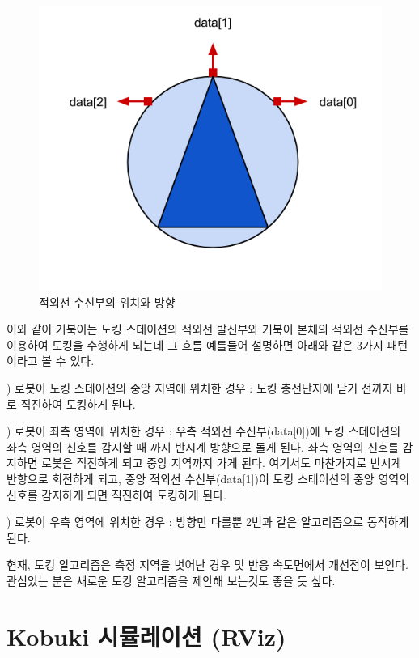 \begin{figure}[h]
\centering\includegraphics[width=0.6\columnwidth]{pictures/chapter10/dock_ir.png}
\caption{적외선 수신부의 위치와 방향}
\end{figure}

이와 같이 거북이는 도킹 스테이션의 적외선 발신부와 거북이 본체의 적외선 수신부를 이용하여 도킹을 수행하게 되는데 그 흐름 예를들어 설명하면 아래와 같은 3가지 패턴이라고 볼 수 있다.


\setcounter{num}{0}

\vspace{\baselineskip}
\noindent
{}
\thenum) 로봇이 도킹 스테이션의 중앙 지역에 위치한 경우
:  도킹 충전단자에 닫기 전까지 바로 직진하여 도킹하게 된다.

\vspace{\baselineskip}
\noindent
{}
\thenum) 로봇이 좌측 영역에 위치한 경우
: 우측 적외선 수신부(data[0])에 도킹 스테이션의 좌측 영역의 신호를 감지할 때 까지 반시계 방향으로 돌게 된다. 좌측 영역의 신호를 감지하면 로봇은 직진하게 되고 중앙 지역까지 가게 된다. 여기서도 마찬가지로 반시계 반향으로 회전하게 되고, 중앙 적외선 수신부(data[1])이 도킹 스테이션의 중앙 영역의 신호를 감지하게 되면 직진하여 도킹하게 된다.

\vspace{\baselineskip}
\noindent
{}
\thenum) 로봇이 우측 영역에 위치한 경우
: 방향만 다를뿐 2번과 같은 알고리즘으로 동작하게 된다.

현재, 도킹 알고리즘은 측정  지역을 벗어난 경우 및 반응 속도면에서 개선점이 보인다. 관심있는 분은 새로운 도킹 알고리즘을 제안해 보는것도 좋을 듯 싶다.


\newpage
\section{Kobuki 시뮬레이션 (RViz)}

